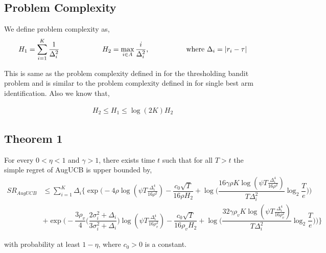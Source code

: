 

\subsection{Problem Complexity}

We define problem complexity as,
\begin{align*}
H_{1} = \sum_{i=1}^{K}\dfrac{1}{\Delta_{i}^{2}}  \text{\hspace*{6em}} H_{2}=\max_{i\in A}\dfrac{i}{{\Delta_{i}^{2}}} \text{,\hspace*{5em} where } \Delta_{i}=|r_{i}-\tau|
\end{align*}

This is same as the problem complexity defined in \cite{locatelli2016optimal} for the thresholding bandit problem and is similar to the problem complexity defined in \cite{audibert2010best} for single best arm identification. Also we know that,

\begin{align*}
H_{2}\leq H_{1}\leq \log(2K)H_{2}
\end{align*}


\subsection{Theorem 1}

\begin{theorem}
\label{Result:Theorem:1}

For every $0<\eta <1$ and $\gamma > 1$, there exists time $t$ such that for all $T>t$ the simple regret of AugUCB is upper bounded by,
\begin{align*}
SR_{AugUCB} & \leq \sum_{i=1}^{K} \Delta_{i}\bigg\lbrace \exp\bigg(-4\rho\log (\psi T\frac{\Delta_{i}^{4}}{16\rho^{2}})-\dfrac{c_{0}\sqrt{T}}{16\rho H_{2}} + \log \big( \dfrac{16\gamma\rho K\log (\psi T \frac{\Delta_{i}^{4}}{16\rho^{2}})}{T\Delta_{i}^{2}}\log_{2}\dfrac{T}{e} \big) \bigg) \\
& + \exp\bigg(- \dfrac{3\rho_v}{4} \bigg(\dfrac{2\sigma_{i}^{2}+\Delta_{i}}{3\sigma_{i}^{2}+\Delta_{i}}\bigg)\log(\psi T\frac{\Delta_{i}^{4}}{16\rho_{v}^{2}}) -\dfrac{c_{0}\sqrt{T}}{16\rho_v H_{2}} + \log\big ( \dfrac{32\gamma\rho_v K\log (\psi T \frac{\Delta_{i}^{4}}{16\rho_{v}^{2}})}{T\Delta_{i}^{2}}\log_{2}\dfrac{T}{e} \big)  \bigg)\bigg\rbrace
\end{align*}

with probability at least $1-\eta$, where $c_{0}>0$ is a constant.

\end{theorem}


